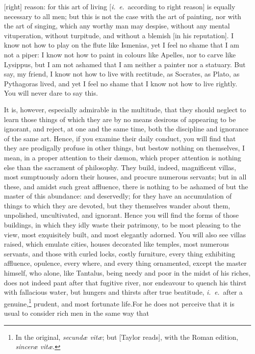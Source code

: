 \documentclass[twoside]{article}
\begin{document}
[right] reason: for this art of living [\textit{i.~e.}~according to right
reason] is equally necessary to all men; but this is not the case with the art
of painting, nor with the art of singing, which any worthy man may despise,
without any mental vituperation, without turpitude, and without a blemish [in
his reputation]. I know not how to play on the flute like Ismenias, yet I feel
no shame that I am not a piper: I know not how to paint in colours like
Apelles, nor to carve like Lysippus, but I am not ashamed that I am neither a
painter nor a statuary. But say, my friend, I know not how to live with
rectitude, as Socrates, as Plato, as Pythagoras lived, and yet I feel no shame
that I know not how to live rightly. You will never dare to say this.

It is, however, especially admirable in the multitude, that they should neglect
to learn those things of which they are by no means desirous of appearing to be
ignorant, and reject, at one and the same time, both the discipline and
ignorance of the same art. Hence, if you examine their daily conduct, you will
find that they are prodigally profuse in other things, but bestow nothing on
themselves, I mean, in a proper attention to their d{\ae}mon, which proper
attention is nothing else than the sacrament of philosophy. They build, indeed,
magnificent villas, most sumptuously adorn their houses, and procure numerous
servants; but in all these, and amidst such great affluence, there is nothing
to be ashamed of but the master of this abundance: and deservedly; for they
have an accumulation of things to which they are devoted, but they themselves
wander about them, unpolished, uncultivated, and ignorant. Hence you will find
the forms of those buildings, in which they idly waste their patrimony, to be
most pleasing to the view, most exquisitely built, and most elegantly adorned.
You will also see villas raised, which emulate cities, houses decorated like
temples, most numerous servants, and those with curled locks, costly furniture,
every thing exhibiting affluence, opulence, every where, and every thing
ornamented, except the master himself, who alone, like Tantalus, being needy
and poor in the midst of his riches, does not indeed pant after that fugitive
river, nor endeavour to quench his thirst with fallacious water, but hungers
and thirsts after true beatitude, \textit{i.~e.}~after a genuine,\footnote{In
the original, \textit{secund{\ae} vit{\ae}}; but [Taylor reads], with the Roman
edition, \textit{sincer{\ae} vit{\ae}}.} prudent, and most fortunate life.For
he does not perceive that it is usual to consider rich men in the same way that
\end{document}

